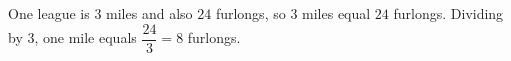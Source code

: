 One league is $3$ miles and also $24$ furlongs, so $3$ miles equal $24$ furlongs. Dividing by $3$, one mile equals $\dfrac{24}{3}=\boxed{8}$ furlongs.
